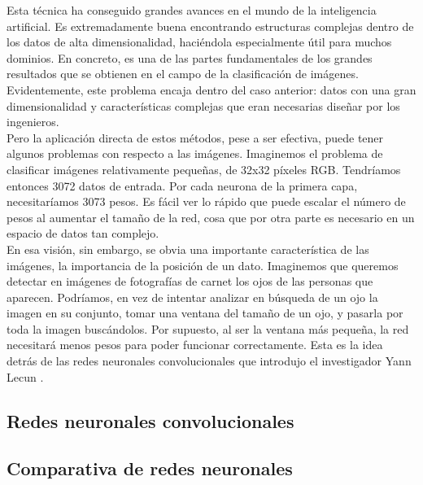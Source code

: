 Esta técnica ha conseguido grandes avances en el mundo de la inteligencia artificial. Es extremadamente buena encontrando estructuras complejas dentro de los datos de alta dimensionalidad, haciéndola especialmente útil para muchos dominios. En concreto, es una de las partes fundamentales de los grandes resultados que se obtienen en el campo de la clasificación de imágenes. Evidentemente, este problema encaja dentro del caso anterior: datos con una gran dimensionalidad y características complejas que eran necesarias diseñar por los ingenieros.\\

Pero la aplicación directa de estos métodos, pese a ser efectiva, puede tener algunos problemas con respecto a las imágenes. Imaginemos el problema de clasificar imágenes relativamente pequeñas, de 32x32 píxeles RGB. Tendríamos entonces 3072 datos de entrada. Por cada neurona de la primera capa, necesitaríamos 3073 pesos. Es fácil ver lo rápido que puede escalar el número de pesos al aumentar el tamaño de la red, cosa que por otra parte es necesario en un espacio de datos tan complejo.\\

En esa visión, sin embargo, se obvia una importante característica de las imágenes, la importancia de la posición de un dato. Imaginemos que queremos detectar en imágenes de fotografías de carnet los ojos de las personas que aparecen. Podríamos, en vez de intentar analizar en búsqueda de un ojo la imagen en su conjunto, tomar una ventana del tamaño de un ojo, y pasarla por toda la imagen buscándolos. Por supuesto, al ser la ventana más pequeña, la red necesitará menos pesos para poder funcionar correctamente. Esta es la idea detrás de las redes neuronales convolucionales que introdujo el investigador Yann Lecun .\\ 

\subsection{Redes neuronales convolucionales}


\subsection{Comparativa de redes neuronales}

